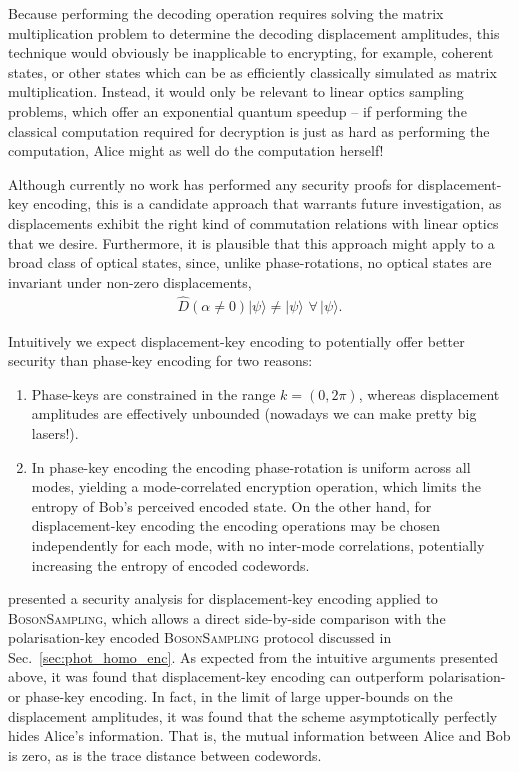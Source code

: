 \documentclass[aps,rmp,twocolumn,amsmath,amssymb,nofootinbib,superscriptaddress,longbibliography,floatfix,table-of-contents,eqsecnum]{revtex4-1}
\newcommand{\ket}[1]{|#1\rangle}
\begin{document}
Because performing the decoding operation requires solving the matrix multiplication problem to determine the decoding displacement amplitudes, this technique would obviously be inapplicable to encrypting, for example, coherent states, or other states which can be as efficiently classically simulated as matrix multiplication. Instead, it would only be relevant to linear optics sampling problems, which offer an exponential quantum speedup -- if performing the classical computation required for decryption is just as hard as performing the computation, Alice might as well do the computation herself!

Although currently no work has performed any security proofs for displacement-key encoding, this is a candidate approach that warrants future investigation, as displacements exhibit the right kind of commutation relations with linear optics that we desire. Furthermore, it is plausible that this approach might apply to a broad class of optical states, since, unlike phase-rotations, no optical states are invariant under non-zero displacements,
\begin{align}
\hat{D}(\alpha\neq 0)\ket\psi \neq \ket\psi\,\,\forall\,\ket\psi.
\end{align}

Intuitively we expect displacement-key encoding to potentially offer better security than phase-key encoding for two reasons:
\begin{enumerate}
\item Phase-keys are constrained in the range \mbox{$k=(0,2\pi)$}, whereas displacement amplitudes are effectively unbounded (nowadays we can make pretty big lasers!).
\item In phase-key encoding the encoding phase-rotation is uniform across all modes, yielding a mode-correlated encryption operation, which limits the entropy of Bob's perceived encoded state. On the other hand, for displacement-key encoding the encoding operations may be chosen independently for each mode, with no inter-mode correlations, potentially increasing the entropy of encoded codewords.
\end{enumerate}

\cite{???} presented a security analysis for displacement-key encoding applied to \textsc{BosonSampling}, which allows a direct side-by-side comparison with the polarisation-key encoded \textsc{BosonSampling} protocol discussed in Sec.~\ref{sec:phot_homo_enc}. As expected from the intuitive arguments presented above, it was found that displacement-key encoding can outperform polarisation- or phase-key encoding. In fact, in the limit of large upper-bounds on the displacement amplitudes, it was found that the scheme asymptotically perfectly hides Alice's information. That is, the mutual information between Alice and Bob is zero, as is the trace distance between codewords.
\end{document}
